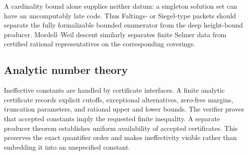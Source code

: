 A cardinality bound alone supplies neither datum: a singleton solution set can
have an uncomputably late code.  Thus Faltings- or Siegel-type packets should
separate the fully formalizable bounded enumerator from the deep height-bound
producer.  Mordell--Weil descent similarly separates finite Selmer data from
certified rational representatives on the corresponding coverings.

\subsection{Analytic number theory}

Ineffective constants are handled by certificate interfaces.  A finite
analytic certificate records explicit cutoffs, exceptional alternatives,
zero-free margins, truncation parameters, and rational upper and lower bounds.
The verifier proves that accepted constants imply the requested finite
inequality.  A separate producer theorem establishes uniform availability of
accepted certificates.  This preserves the exact quantifier order and makes
ineffectivity visible rather than embedding it into an unspecified constant.
